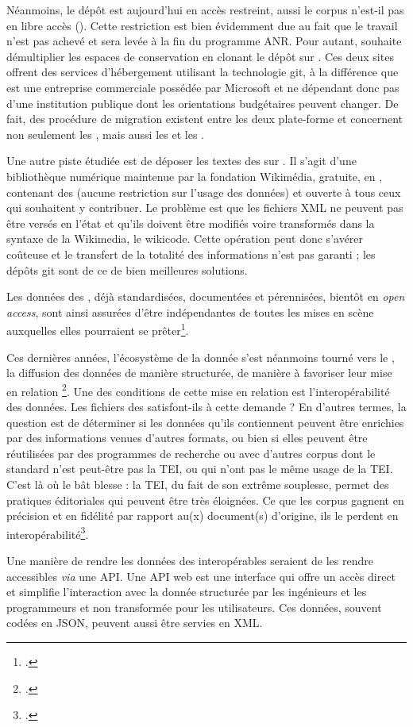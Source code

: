Néanmoins, le dépôt \gitlab{} est aujourd'hui en accès restreint, aussi le corpus n'est-il pas en libre accès (\openaccess). Cette restriction est bien évidemment due au fait que le travail n'est pas achevé et sera levée à la fin du programme ANR. Pour autant, \timeus{} souhaite démultiplier les espaces de conservation en clonant le dépôt \gitlab{} sur \github. Ces deux sites offrent des services d'hébergement utilisant la technologie git, à la différence que \github{} est une entreprise commerciale possédée par Microsoft et ne dépendant donc pas d'une institution publique dont les orientations budgétaires peuvent changer. De fait, des procédure de migration existent entre les deux plate-forme et concernent non seulement les \commits{}, mais aussi les \issues{} et les \mergerequests.

Une autre piste étudiée est de déposer les textes des \odm{} sur \wikisource. Il s'agit d'une bibliothèque numérique maintenue par la fondation Wikimédia, gratuite, en \openaccess, contenant des \opendata{} (aucune restriction sur l'usage des données) et ouverte à tous ceux qui souhaitent y contribuer. Le problème est que les fichiers XML ne peuvent pas être versés en l'état et qu'ils doivent être modifiés voire transformés dans la syntaxe de la Wikimedia, le wikicode. Cette opération peut donc s'avérer coûteuse et le transfert de la totalité des informations n'est pas garanti ; les dépôts git sont de ce \pov{} de bien meilleures solutions.

Les données des \odm, déjà standardisées, documentées et pérennisées, bientôt en \textit{open access}, sont ainsi assurées d'être indépendantes de toutes les mises en scène auxquelles elles pourraient se prêter\footcite[p. 63]{jolivet}.

Ces dernières années, l'écosystème de la donnée s'est néanmoins tourné vers le \linkeddata, \cad{} la diffusion des données \og de manière structurée, de manière à favoriser leur mise en relation \fg\footcite[p. 66]{jolivet}. Une des conditions de cette mise en relation est l'interopérabilité des données. Les fichiers des \odm{} satisfont-ils à cette demande ? En d'autres termes, la question est de déterminer si les données qu'ils contiennent peuvent être enrichies par des informations venues d'autres formats, ou bien si elles peuvent être réutilisées par des programmes de recherche ou avec d'autres corpus dont le standard n'est peut-être pas la TEI, ou qui n'ont pas le même usage de la TEI. C'est là où le bât blesse : la TEI, du fait de son extrême souplesse, permet des pratiques éditoriales qui peuvent être très éloignées. Ce que les corpus gagnent en précision et en fidélité par rapport au(x) document(s) d'origine, ils le perdent en interopérabilité\footcite[p. 61-62]{jolivet}.

Une manière de rendre les données des \odm{} interopérables seraient de les rendre accessibles \textit{via} une API. Une API web est une interface qui offre un accès direct et simplifie l'interaction avec la donnée structurée par les ingénieurs et les programmeurs et non transformée pour les utilisateurs. Ces données, souvent codées en JSON, peuvent aussi être servies en XML.